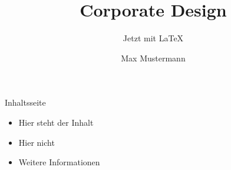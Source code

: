 \documentclass[12pt]{beamer}
\title{Corporate Design}
\subtitle{Jetzt mit \LaTeX}
\author{Max Mustermann}
\begin{document}
\begin{frame}[plain]
  \titlepage
\end{frame}

\begin{frame}{Inhaltsseite}
  \begin{itemize}
    \item Hier steht der Inhalt
    \item Hier nicht
    \item Weitere Informationen
  \end{itemize}
\end{frame}
\end{document}
